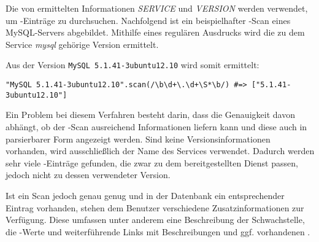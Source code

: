 Die von  ermittelten
Informationen \textit{SERVICE} und \textit{VERSION} werden verwendet, um
-Einträge zu durchsuchen. Nachfolgend ist ein beispielhafter
-Scan eines MySQL-Servers abgebildet. Mithilfe eines regulären
Ausdrucks wird die zu dem Service \textit{mysql} gehörige Version
ermittelt.


Aus der Version \verb|MySQL 5.1.41-3ubuntu12.10| wird somit ermittelt:

\begin{lstlisting}[numbers=none]
  "MySQL 5.1.41-3ubuntu12.10".scan(/\b\d+\.\d+\S*\b/) #=> ["5.1.41-3ubuntu12.10"]
\end{lstlisting}

Ein Problem bei diesem Verfahren besteht darin, dass die Genauigkeit
davon abhängt, ob der -Scan ausreichend Informationen liefern kann
und diese auch in parsierbarer Form angezeigt werden.
Sind keine Versionsinformationen vorhanden, wird ausschließlich
der Name des Services verwendet. Dadurch werden sehr viele -Einträge
gefunden, die zwar zu dem bereitgestellten Dienst passen, jedoch
nicht zu dessen verwendeter Version.

Ist ein Scan jedoch genau genug und in der Datenbank ein
entsprechender Eintrag vorhanden, stehen dem Benutzer verschiedene
Zusatzinformationen zur Verfügung. Diese umfassen unter anderem eine
Beschreibung der Schwachstelle, die -Werte und weiterführende Links
mit Beschreibungen und ggf. vorhandenen .

